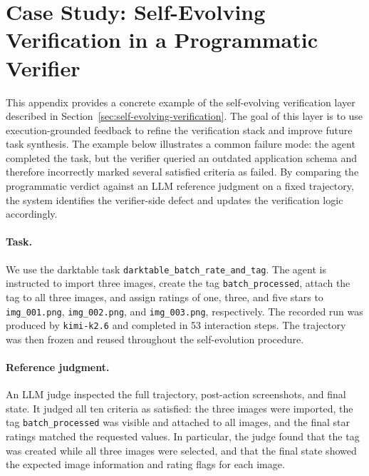 \section{Case Study: Self-Evolving Verification in a Programmatic Verifier}
\label{app:self-evolving-verification-case-study}

This appendix provides a concrete example of the self-evolving verification
layer described in Section~\ref{sec:self-evolving-verification}. The goal of this
layer is to use execution-grounded feedback to refine the verification stack and
improve future task synthesis. The example below illustrates a common failure
mode: the agent completed the task, but the verifier queried an outdated
application schema and therefore incorrectly marked several satisfied criteria as
failed. By comparing the programmatic verdict against an LLM reference judgment
on a fixed trajectory, the system identifies the verifier-side defect and updates
the verification logic accordingly.

\paragraph{Task.}
We use the darktable task \texttt{darktable\_batch\_rate\_and\_tag}. The agent is
instructed to import three images, create the tag \texttt{batch\_processed},
attach the tag to all three images, and assign ratings of one, three, and five
stars to \texttt{img\_001.png}, \texttt{img\_002.png}, and
\texttt{img\_003.png}, respectively. The recorded run was produced by
\texttt{kimi-k2.6} and completed in 53 interaction steps. The trajectory was then
frozen and reused throughout the self-evolution procedure.

\paragraph{Reference judgment.}
An LLM judge inspected the full trajectory, post-action screenshots, and final
state. It judged all ten criteria as satisfied: the three images were imported,
the tag \texttt{batch\_processed} was visible and attached to all images, and the
final star ratings matched the requested values. In particular, the judge found
that the tag was created while all three images were selected, and that the final
state showed the expected image information and rating flags for each image.

